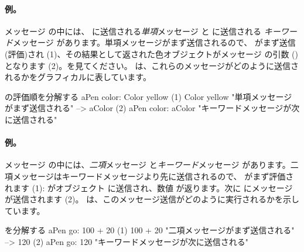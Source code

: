 \documentclass[a4paper,10pt,twoside]{book}
\begin{document}


\paragraph{例。}
メッセージ  の中には、 に送信される\emph{単項}メッセージ と  に送信される \emph{キーワード}メッセージ  があります。単項メッセージがまず送信されるので、 がまず送信(評価)され (1)、その結果として返された色オブジェクトがメッセージ  の引数 () となります (2)。を見てください。
 は、これらのメッセージがどのように送信されるかをグラフィカルに表しています。

\begin{example}[decColor]{ の評価順を分解する}{}
        aPen color: Color yellow
(1)                       Color yellow        "単項メッセージがまず送信される"
                        --> aColor
(2)   aPen color: aColor                 "キーワードメッセージが次に送信される"
\end{example}

\paragraph{例。} メッセージ  の中には、\emph{二項}メッセージ  と\emph{キーワード}メッセージ  があります。二項メッセージはキーワードメッセージより先に送信されるので、 がまず評価されます (1):  がオブジェクト  に送信され、数値  が返ります。次に  にメッセージ  が送信されます (2)。
は、このメッセージ送信がどのように実行されるかを示しています。

\begin{example}[decGo]{ を分解する}{}
      aPen go: 100 + 20   
(1)                 100 + 20           "二項メッセージがまず送信される"
                   -->   120
(2)  aPen go: 120                   "キーワードメッセージが次に送信される"
\end{example}
\end{document}
